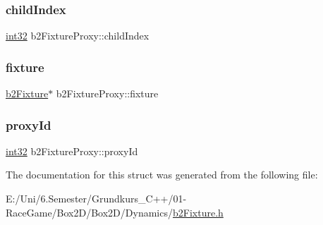 \mbox{\label{structb2_fixture_proxy_a2edb15552cf71f48dacc3608bb134166}} 
\subsubsection{\texorpdfstring{childIndex}{childIndex}}
{\footnotesize\ttfamily \mbox{\hyperlink{b2_settings_8h_a43d43196463bde49cb067f5c20ab8481}{int32}} b2\+Fixture\+Proxy\+::child\+Index}

\mbox{\label{structb2_fixture_proxy_a3a0842dc9699c25658548c2005d0ef62}} 
\subsubsection{\texorpdfstring{fixture}{fixture}}
{\footnotesize\ttfamily \mbox{\hyperlink{classb2_fixture}{b2\+Fixture}}$\ast$ b2\+Fixture\+Proxy\+::fixture}

\mbox{\label{structb2_fixture_proxy_aa0ca7e71341368fe6c6913fb39c7283b}} 
\subsubsection{\texorpdfstring{proxyId}{proxyId}}
{\footnotesize\ttfamily \mbox{\hyperlink{b2_settings_8h_a43d43196463bde49cb067f5c20ab8481}{int32}} b2\+Fixture\+Proxy\+::proxy\+Id}



The documentation for this struct was generated from the following file\+:\begin{DoxyCompactItemize}
\item 
E\+:/\+Uni/6.\+Semester/\+Grundkurs\+\_\+\+C++/01-\/\+Race\+Game/\+Box2\+D/\+Box2\+D/\+Dynamics/\mbox{\hyperlink{b2_fixture_8h}{b2\+Fixture.\+h}}\end{DoxyCompactItemize}

